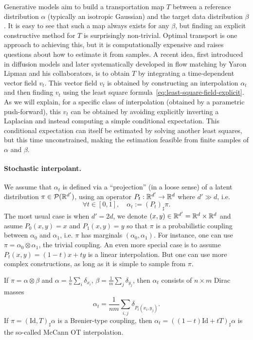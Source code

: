 Generative models aim to build a transportation map $T$ between a reference distribution $\alpha$ (typically an isotropic Gaussian) and the target data distribution $\beta$. It is easy to see that such a map always exists for any $\beta$, but finding an explicit constructive method for $T$ is surprisingly non-trivial. 
%
Optimal transport is one approach to achieving this, but it is computationally expensive and raises questions about how to estimate it from samples. A recent idea, first introduced in diffusion models and later systematically developed in flow matching by Yaron Lipman and his collaborators, is to obtain $T$ by integrating a time-dependent vector field $v_t$. 
%
This vector field $v_t$ is obtained by constructing an interpolation $\alpha_t$ and then finding $v_t$ using the least square formula~\eqref{eq:least-square-field-explicit}. As we will explain, for a specific class of interpolation (obtained by a parametric push-forward), this $v_t$ can be obtained by avoiding explicitly inverting a Laplacian and instead computing a simple conditional expectation. This conditional expectation can itself be estimated by solving another least squares, but this time unconstrained, making the estimation feasible from finite samples of $\alpha$ and $\beta$.

\paragraph{Stochastic interpolant.}

We assume that $\alpha_t$ is defined via a ``projection'' (in a loose sense) of a latent distribution $\pi \in \mathcal{P}(\mathbb{R}^{d'})$, using an operator $P_t : \mathbb{R}^{d'} \to \mathbb{R}^d$ where $d' \gg d$, i.e.
\begin{equation}\label{eq:interp-coupling}
	\forall t \in [0,1], \quad \alpha_t := (P_t)_\sharp \pi.
\end{equation}
The most usual case is when $d'=2d$, we denote $(x,y) \in \mathbb{R}^{d'} = \mathbb{R}^d \times \mathbb{R}^d$ and asume $P_0(x,y)=x$ and $P_1(x,y)=y$ so that $\pi$ is a probabilistic coupling between $\alpha_0$ and $\alpha_1$, i.e. $\pi$ has marginals $(\alpha_0, \alpha_1)$. For instance, one can use $\pi = \alpha_0 \otimes \alpha_1$, the trivial coupling. An even more special case is to assume $P_t(x,y)=(1-t)x+ty$ is a linear interpolation. But one can use more complex constructions, as long as it is simple to sample from $\pi$. 

If $\pi = \alpha \otimes \beta$ and $\alpha = \frac{1}{n} \sum_i \delta_{x_i}$, $\beta = \frac{1}{m} \sum_j \delta_{y_j}$, then $\alpha_t$ consists of $n \times m$ Dirac masses 
\begin{equation*}
    \alpha_t = \frac{1}{nm} \sum_{i,j} \delta_{P_t(x_i,y_j)}.
\end{equation*}
If $\pi = (\mathrm{Id}, T)_\sharp \alpha$ is a Brenier-type coupling, then $\alpha_t = ((1-t)\mathrm{Id} + tT)_\sharp \alpha$ is the so-called McCann OT interpolation.

